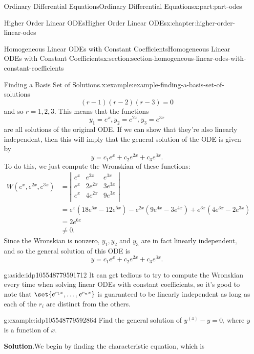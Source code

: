 \documentclass[oneside,10pt,]{book}
\newcommand{\blocktitlefont}{\relax}
\numberwithin{equation}{part}
\newcommand{\amp}{&}
\begin{document}
\begin{partptx}{Ordinary Differential Equations}{}{Ordinary Differential Equations}{}{}{x:part:part-odes}
\begin{chapterptx}{Higher Order Linear ODEs}{}{Higher Order Linear ODEs}{}{}{x:chapter:higher-order-linear-odes}
\begin{sectionptx}{Homogeneous Linear ODEs with Constant Coefficients}{}{Homogeneous Linear ODEs with Constant Coefficients}{}{}{x:section:section-homogeneous-linear-odes-with-constant-coefficients}
\begin{example}{Finding a Basis Set of Solutions.}{x:example:example-finding-a-basis-set-of-solutions}
\begin{equation*}
(r-1)(r-2)(r-3)=0
\end{equation*}
and so \(r=1,2,3.\) This means that the functions%
\begin{equation*}
y_{1} = e^{x},y_{2} = e^{2x},y_{3} = e^{3x}
\end{equation*}
are all solutions of the original ODE. If we can show that they're also linearly independent, then this will imply that the general solution of the ODE is given by%
\begin{equation*}
y = c_{1}e^{x}+c_{2}e^{2x}+c_{3}e^{3x}.
\end{equation*}
To do this, we just compute the Wronskian of these functions:%
%
\begin{align*}
W(e^{x},e^{2x},e^{3x})
\amp= \left|
\begin{array}{ccc}
e^{x} \amp e^{2x}  \amp e^{3x}  \\
e^{x} \amp 2e^{2x} \amp 3e^{3x} \\
e^{x} \amp 4e^{2x} \amp 9e^{3x} \\
\end{array}
\right|\\
\amp= e^{x}(18e^{5x}-12e^{5x})-e^{2x}(9e^{4x}-3e^{4x})+e^{3x}(4e^{3x}-2e^{3x})\\
\amp= 2e^{6x}\\
\amp\neq0.
\end{align*}
Since the Wronskian is nonzero, \(y_{1},y_{2}\) and \(y_{3}\) are in fact linearly independent, and so the general solution of this ODE is%
\begin{equation*}
y = c_{1}e^{x}+c_{2}e^{2x}+c_{3}e^{3x}.
\end{equation*}
%
\end{example}
\begin{aside}{}{g:aside:idp105548779591712}%
It can get tedious to try to compute the Wronskian every time when solving linear ODEs with constant coefficients, so it's good to note that \(\set{e^{r_{1}x},\dots,e^{r_{n}x}}\) is guaranteed to be linearly independent as long as each of the \(r_{i}\) are distinct from the others.%
\end{aside}
\begin{example}{}{g:example:idp105548779592864}%
Find the general solution of \(y^{(4)}-y=0\), where \(y\) is a function of \(x\).%
\par\smallskip%
\noindent\textbf{\blocktitlefont Solution}.\hypertarget{g:solution:idp105548779528992}{}\quad{}We begin by finding the characteristic equation, which is%
\begin{equation*}

\end{equation*}
\end{example}
\end{sectionptx}
\end{chapterptx}
\end{partptx}
\end{document}
